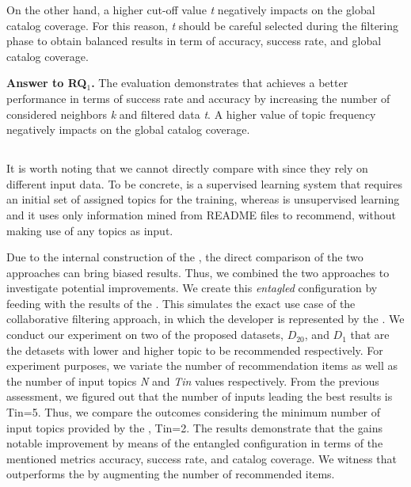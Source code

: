 

On the other hand, a higher cut-off value \emph{t} negatively impacts on the global catalog coverage. For this reason, \emph{t} should be careful selected during the filtering phase to obtain balanced results in term of accuracy, success rate, and global catalog coverage.

\begin{tcolorbox}[boxrule=0.86pt,left=0.3em, right=0.3em,top=0.1em, bottom=0.05em]
\textbf{Answer to RQ$_1$.} The evaluation demonstrates that \TF achieves a better performance in terms of success rate and accuracy by increasing the number of considered neighbors \emph{k} and filtered data \emph{t}. %
A higher value of topic frequency negatively impacts on the global catalog coverage.
\end{tcolorbox}


%

\subsection{\rqsecond} \label{sec:EXP3}


It is worth noting that we cannot directly compare \TF with \MNB since they rely on different input data. To be concrete, \TF is a supervised learning system that requires an initial set of assigned topics for the training, whereas \MNB is unsupervised learning and it uses only information mined from README files to recommend, without making use of any topics as input. 

Due to the internal construction of the \MNB, the direct comparison of the two approaches can bring biased results. Thus, we combined the two approaches to investigate potential improvements. We create this \emph{entagled} configuration by feeding \TF with the results of the \MNB. This simulates the exact use case of the collaborative filtering approach, in which the developer is represented by the \MNB. 
We conduct our experiment on two of the proposed datasets, \ie  $D_{20}$, and  $D_{1}$ that are the detasets with lower and higher topic to be recommended respectively.
For experiment purposes, we variate the number of recommendation items as well as the number of input topics \ie \emph{N} and \emph{Tin} values respectively. From the previous assessment, we figured out that the number of inputs leading the best results is Tin=5. Thus, we compare the outcomes considering the minimum number of input topics provided by the \MNB, \ie Tin=2. The results demonstrate that the \MNB gains notable improvement by means of the entangled configuration in terms of the mentioned metrics \ie accuracy, success rate, and catalog coverage. We witness that \TF outperforms the \MNB by augmenting the number of recommended items. 

